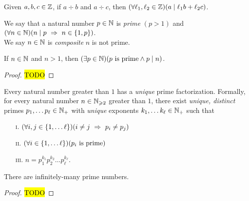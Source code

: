 \begin{corollary}
    Given $a, b, c \in \mathbb{Z}$, if $a \div b$ and $a \div c$,
    then $\pn*{\forall \ell_1, \ell_2 \in \Z}\pn*{a \div \ell_1b + \ell_2c}$.
\end{corollary}

\begin{definition}
    We say that a natural number $p \in \mathbb{N}$ is \emph{prime} \iffbydefn 
    $(p > 1)$ and $\pn*{\forall n \in \N}\pn*{n \div p \implies n \in \set*{1, p}}$.\\
    We say $n \in \mathbb{N}$ is \emph{composite} \iffbydefn $n$ is not prime.
\end{definition}

\begin{lemma}
    If $n \in \mathbb{N}$ and $n > 1$, then $\pn*{\exists p \in \N}\pn*{p \text{ is prime} \meet p \div n}$.
\end{lemma}
\begin{proof}
    \hl{TODO}
\end{proof}

\begin{theorem}
    Every natural number greater than $1$ has a \emph{unique} prime factorization.
    Formally, for every natural number $n \in \mathbb{N}_{\geqslant 2}$ greater than $1$,
    there exist \emph{unique, distinct} primes $p_1, \dots p_\ell \in \mathbb{N}_+$
    with \emph{unique} exponents $k_1, \dots k_\ell \in \mathbb{N}_+$ such that
    \begin{enumerate}
        \item[\textsc{i.}]
            $\pn*{\forall i, j \in \set*{1, \dots \ell}}\pn*{i \neq j \implies p_i \neq p_j}$
        \item[\textsc{ii.}]
            $\pn*{\forall i \in \set*{1, \dots \ell}}\pn*{p_i \text{ is prime}}$
        \item[\textsc{iii.}]
            $n = p_1^{k_1} p_2^{k_2} \dots p_\ell^{k_\ell}$.
    \end{enumerate}
\end{theorem}

\begin{theorem}
    There are infinitely-many prime numbers.
\end{theorem}
\begin{proof}
    \hl{TODO}
\end{proof}


